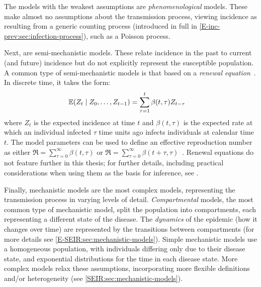 \documentclass[thesis.tex]{subfiles}
\begin{document}
The models with the weakest assumptions are \emph{phenomenological} models.
These make almost no assumptions about the transmission process, viewing incidence as resulting from a generic counting process (introduced in full in \cref{E-inc-prev:sec:infection-process}), such as a Poisson process.

Next, are semi-mechanistic models.
These relate incidence in the past to current (and future) incidence but do not explicitly represent the susceptible population.
A common type of semi-mechanistic models is that based on a \emph{renewal equation}~\autocite{bhattSemimechanistic,fraserRenewal}.
In discrete time, it takes the form:
\begin{align}
    \operatorname{\mathbb{E}}(Z_t \mid Z_0, \dots, Z_{t-1}) &= \sum_{\tau=1}^t \beta(t,\tau) Z_{t-\tau}
    \label{intro:eq:renewal}
\end{align}
where $Z_t$ is the expected incidence at time $t$ and $\beta(t, \tau)$ is the expected rate at which an individual infected $\tau$ time units ago infects individuals at calendar time $t$.
The model parameters can be used to define an effective reproduction number as either $\Re = \sum_{\tau=0}^\infty \beta(t, \tau)$ or $\Re = \sum_{\tau=0}^\infty \beta(t+\tau, \tau)$~\autocite{gosticPractical}.
Renewal equations do not feature further in this thesis; for further details, including practical considerations when using them as the basis for inference, see \textcite{thompsonImproved,gosticPractical}.

Finally, mechanistic models are the most complex models, representing the transmission process in varying levels of detail.
\emph{Compartmental} models, the most common type of mechanistic model, split the population into compartments, each representing a different state of the disease.
The \emph{dynamics} of the epidemic (how it changes over time) are represented by the transitions between compartments (for more details see \cref{E-SEIR:sec:mechanistic-models}).
Simple mechanistic models use a homogeneous population, with individuals differing only due to their disease state, and exponential distributions for the time in each disease state.
More complex models relax these assumptions, incorporating more flexible definitions and/or heterogeneity (see \cref{SEIR:sec:mechanistic-models}).
\end{document}
